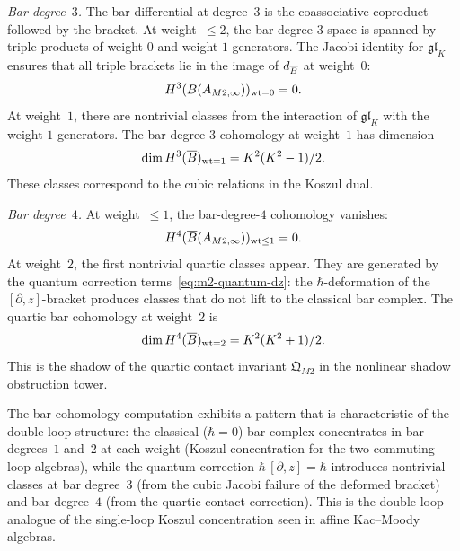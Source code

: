 \begin{computation}
\emph{Bar degree~$3$.}
The bar differential at degree~$3$ is the coassociative
coproduct followed by the bracket. At weight~$\le 2$, the
bar-degree-$3$ space is spanned by triple products of
weight-$0$ and weight-$1$ generators. The Jacobi identity
for $\mathfrak{gl}_K$ ensures that all triple brackets lie
in the image of $d_{\overline{B}}$ at weight~$0$:
\begin{equation}%
H^3(\barB(A_{M2,\infty}))_{\mathrm{wt}=0} = 0.
\end{equation}
At weight~$1$, there are nontrivial classes from the
interaction of $\mathfrak{gl}_K$ with the weight-$1$ generators.
The bar-degree-$3$ cohomology at weight~$1$ has dimension
\begin{equation}%
\dim H^3(\barB)_{\mathrm{wt}=1}
= K^2(K^2-1)/2.
\end{equation}
These classes correspond to the cubic relations in the Koszul dual.

\emph{Bar degree~$4$.}
At weight~$\le 1$, the bar-degree-$4$ cohomology vanishes:
\begin{equation}%
H^4(\barB(A_{M2,\infty}))_{\mathrm{wt}\le 1} = 0.
\end{equation}
At weight~$2$, the first nontrivial quartic classes appear.
They are generated by the quantum correction
terms~\eqref{eq:m2-quantum-dz}: the $\hbar$-deformation
of the $[\partial,z]$-bracket produces classes that
do not lift to the classical bar complex. The quartic
bar cohomology at weight~$2$ is
\begin{equation}%
\dim H^4(\barB)_{\mathrm{wt}=2}
= K^2(K^2+1)/2.
\end{equation}
This is the shadow of the quartic contact invariant
$\mathfrak{Q}_{M2}$ in the nonlinear shadow obstruction tower.
\end{computation}

\begin{remark}
The bar cohomology computation exhibits a pattern that is
characteristic of the double-loop structure: the classical
($\hbar=0$) bar complex concentrates in bar degrees~$1$
and~$2$ at each weight (Koszul concentration for the two
commuting loop algebras), while the quantum correction
$\hbar\,[\partial,z]=\hbar$ introduces nontrivial classes
at bar degree~$3$ (from the cubic Jacobi failure of the
deformed bracket) and bar degree~$4$ (from the quartic
contact correction). This is the double-loop analogue of
the single-loop Koszul concentration seen in affine
Kac--Moody algebras.
\end{remark}


